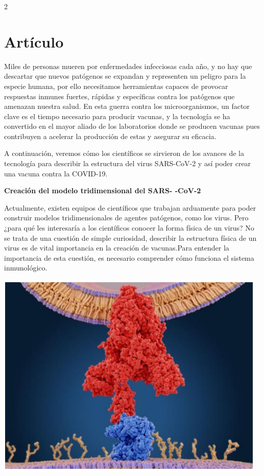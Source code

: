 \documentclass[12pt,spanish,Letterpaper,openany]{book}
\begin{document}
\begin {multicols}{2}

\hypertarget{artuxedculo-5}{%
\section{Artículo}\label{artuxedculo-5}}

Miles de personas mueren por enfermedades infecciosas cada año, y no hay que descartar que
nuevos patógenos se expandan y representen un peligro para la especie humana, por ello
necesitamos herramientas capaces de provocar respuestas inmunes fuertes, rápidas y
específicas contra los patógenos que amenazan nuestra salud. En esta guerra contra los
microorganismos, un factor clave es el tiempo necesario para producir vacunas, y la tecnología
se ha convertido en el mayor aliado de los laboratorios donde se producen vacunas pues
contribuyen a acelerar la producción de estas y asegurar su eficacia.

A continuación, veremos cómo los científicos se sirvieron de los avances de la tecnología para
describir la estructura del virus SARS-CoV-2 y así poder crear una vacuna contra la COVID-19.

\textbf{Creación del modelo tridimensional del SARS-
-CoV-2}

Actualmente, existen equipos de científicos que trabajan arduamente para poder construir modelos
tridimensionales de agentes patógenos, como los virus. Pero ¿para qué les interesaría a los científicos conocer
la forma física de un virus? No se trata de una cuestión de simple curiosidad, describir la estructura física de un
virus es de vital importancia en la creación de vacunas.Para entender la importancia de esta cuestión, es
necesario comprender cómo funciona el sistema inmunológico.

\begin {flushleft}
\noindent\begin{minipage}[c]{\columnwidth}
\centering

\includegraphics[width=0.65\linewidth]{images/pareja51_01}


\end{minipage}
\end{flushleft}
\end{multicols}
\end{document}
